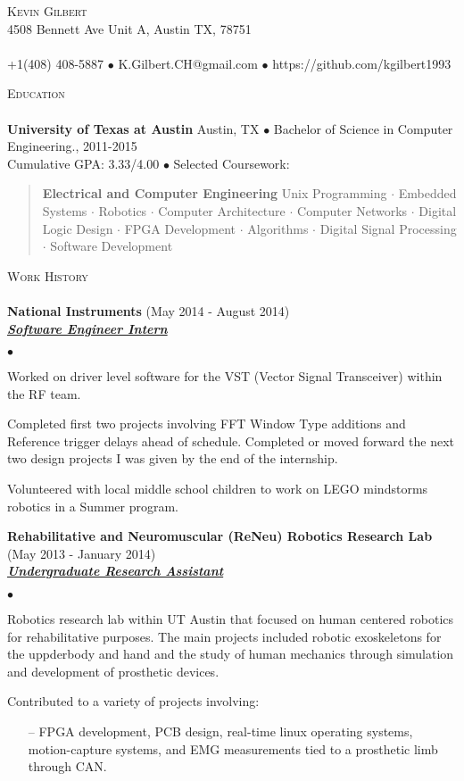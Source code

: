 \documentclass[11pt]{article}
\newcommand{\area}[2]{\vspace*{-9pt} \begin{verse}\textbf{#1}   #2 \end{verse}  }
\newcommand{\lineunder}{\vspace*{-8pt} \\ \hspace*{-18pt} \hrulefill \\}
\newcommand{\header}[1]{{\hspace*{-10pt}\vspace*{6pt} \textsc{#1}} \vspace*{-6pt} \lineunder}
\newcommand{\employer}[3]{{ \textbf{#1} (#2)\\ \underline{\textbf{\emph{#3}}}\\  }}
\newcommand{\contact}[3]{
\vspace*{-8pt}
\begin{center}
{\LARGE \scshape {#1}}\\
#2 \lineunder 
#3
\end{center}
\vspace*{-8pt}
}
\newenvironment{achievements}{\begin{list}{$\bullet$}{\topsep 0pt \itemsep -2pt}}{\vspace*{4pt}\end{list}}
\newcommand{\schoolwithcourses}[4]{
 \textbf{#1} #2 $\bullet$ #3\\ 
#4 $\bullet$  Selected Coursework:\\
\vspace*{5pt}
}
\begin{document}
\small
\smallskip
\vspace*{-44pt}

\contact{Kevin Gilbert}
{4508 Bennett Ave Unit A, Austin TX, 78751}
{+1(408) 408-5887 $\bullet$ K.Gilbert.CH@gmail.com  $\bullet$ https://github.com/kgilbert1993}

\header{Education}

\schoolwithcourses{University of Texas at Austin}{Austin, TX}{Bachelor of Science in Computer Engineering., 2011-2015}
{Cumulative GPA: 3.33/4.00}
	\area{Electrical and Computer Engineering}{ Unix Programming $\cdot$ Embedded Systems $\cdot$ Robotics $\cdot$ Computer Architecture $\cdot$ Computer Networks $\cdot$ Digital Logic Design $\cdot$ FPGA Development $\cdot$
 Algorithms $\cdot$ Digital Signal Processing $\cdot$ Software Development}

\header{Work History}
\employer{National Instruments}{May 2014 - August 2014}{Software Engineer Intern}
	\begin{achievements}
	\item Worked on driver level software for the VST (Vector Signal Transceiver) within the RF team.
    \item Completed first two projects involving FFT Window Type additions and Reference trigger delays ahead of schedule. Completed or moved forward the next two design projects I was given by the end of the internship.
    \item Volunteered with local middle school children to work on LEGO mindstorms robotics in a Summer program.
	\end{achievements}

\employer{Rehabilitative and Neuromuscular (ReNeu) Robotics Research Lab}{May 2013 - January 2014}{Undergraduate Research Assistant}
	\begin{achievements}
    \item Robotics research lab within UT Austin that focused on human centered robotics for rehabilitative purposes. The main projects included robotic exoskeletons for the uppderbody and hand and the study of human mechanics through simulation and development of prosthetic devices. 
	\item Contributed to a variety of projects involving:
    	\begin{enumerate}
        	\item[--] FPGA development, PCB design, real-time linux operating systems, motion-capture systems, and EMG measurements tied to a prosthetic limb through CAN.
        \end{enumerate}
	\end{achievements}
\end{document}
